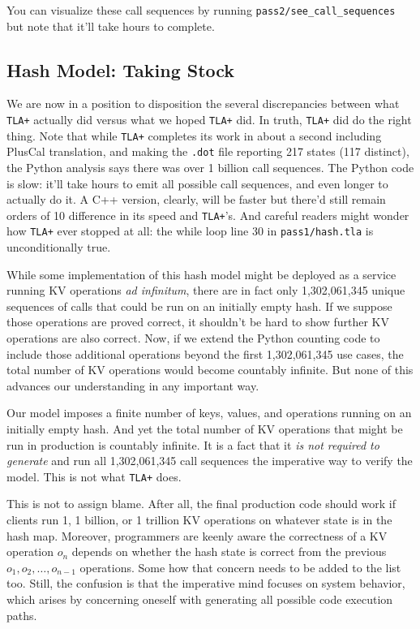 \documentclass[twocolumn]{article}
\begin{document}
\noindent You can visualize these call sequences by running \texttt{pass2/see\_call\_sequences} but note that it'll take hours to complete.

\subsection{Hash Model: Taking Stock}

We are now in a position to disposition the several discrepancies between what \texttt{TLA+} actually did versus what we hoped \texttt{TLA+} did. In truth, \texttt{TLA+} did do the right thing. Note that while \texttt{TLA+} completes its work in about a second including PlusCal translation, and making the \texttt{.dot} file reporting 217 states (117 distinct), the Python analysis says there was over 1 billion call sequences. The Python code is slow: it'll take hours to emit all possible call sequences, and even longer to actually do it. A C++ version, clearly, will be faster but there'd still remain orders of 10 difference in its speed and \texttt{TLA+}'s. And careful readers might wonder how \texttt{TLA+} ever stopped at all: the while loop line 30 in \texttt{pass1/hash.tla} is unconditionally true.

While some implementation of this hash model might be deployed as a service running KV operations \emph{ad infinitum}, there are in fact only 1,302,061,345 unique sequences of calls that could be run on an initially empty hash. If we suppose those operations are proved correct, it shouldn't be hard to show further KV operations are also correct. Now, if we extend the Python counting code to include those additional operations beyond the first 1,302,061,345 use cases, the total number of KV operations would become countably infinite. But none of this advances our understanding in any important way.

Our model imposes a finite number of keys, values, and operations running on an initially empty hash. And yet the total number of KV operations that might be run in production is countably infinite. It is a fact that it \emph{is not required to generate} and run all 1,302,061,345 call sequences the imperative way to verify the model. This is not what \texttt{TLA+} does. 

This is not to assign blame. After all, the final production code should work if clients run 1, 1 billion, or 1 trillion KV operations on whatever state is in the hash map. Moreover, programmers are keenly aware the correctness of a KV operation $o_n$ depends on whether the hash state is correct from the previous $o_1,o_2,\ldots,o_{n-1}$ operations. Some how that concern needs to be added to the list too. Still, the confusion is that the imperative mind focuses on system behavior, which arises by concerning oneself with generating all possible code execution paths. 
\end{document}
